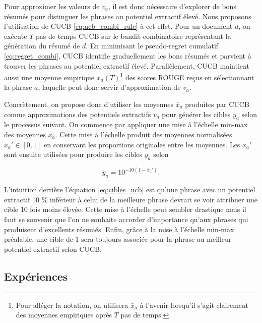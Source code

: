 Pour approximer les valeurs de $v_a$, il est donc nécessaire 
d'explorer de bons résumés pour distinguer les phrases 
au potentiel extractif élevé.
Nous proposons l'utilisation de CUCB \eqref{eq:ucb_combi_rule} à cet effet. 
Pour un document $d$, on exécute $T$ pas de temps CUCB 
sur le bandit combinatoire représentant la génération du résumé de $d$.
En minimisant le pseudo-regret cumulatif \eqref{eq:regret_combi}, CUCB identifie graduellement les 
bons résumés et parvient à trouver les phrases 
au potentiel extractif élevé.
Parallèlement, CUCB maintient aussi une 
moyenne empirique $\bar{x}_a(T)$\footnote{Pour alléger la notation,
on utilisera $\bar{x}_a$ à l'avenir lorsqu'il s'agit clairement 
des moyennes empiriques après $T$ pas de temps.} des scores ROUGE reçus 
en sélectionnant la phrase $a$, laquelle peut donc 
servir d'approximation de $v_a$.

Concrètement, on propose donc d'utiliser les moyennes $\bar{x}_a$ produites 
par CUCB comme approximations des potentiels extractifs $v_a$ pour générer les cibles $y_a$ selon le processus suivant.
On commence par appliquer une mise à l'échelle min-max des moyennes $\bar{x}_a$.
Cette mise à l'échelle produit des moyennes normalisées $\bar{x}_a' \in [0, 1]$
en conservant les proportions originales entre les moyennes.
Les $\bar{x}_a'$ sont ensuite utilisées pour produire les cibles $y_a$ selon

\begin{equation}
    y_a = 10^{-10(1 - \bar{x}_a')}.
    \label{eq:cibles_ucb}
\end{equation}

L'intuition derrière l'équation \eqref{eq:cibles_ucb} est qu'une phrase 
avec un potentiel extractif 10 \% inférieur à celui de la meilleure phrase 
devrait se voir attribuer une cible 10 fois moins élevée. 
Cette mise à l'échelle peut sembler drastique mais il faut se souvenir 
que l'on ne souhaite accorder d'importance qu'aux phrases qui produisent 
d'excellents résumés.
Enfin, grâce à la mise à l'échelle min-max préalable, une cible de 1 
sera toujours associée pour la phrase au meilleur potentiel 
extractif selon CUCB.

\subsection{Expériences}
\label{subsec:exp_cucb}

